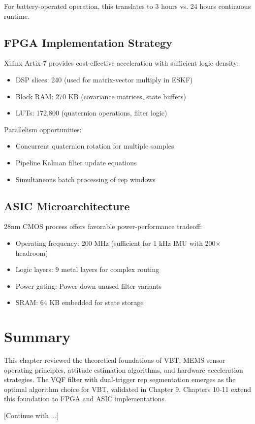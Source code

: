 For battery-operated operation, this translates to 3 hours vs. 24 hours continuous runtime.

\subsection{FPGA Implementation Strategy}

Xilinx Artix-7 provides cost-effective acceleration with sufficient logic density:

\begin{itemize}
    \item DSP slices: 240 (used for matrix-vector multiply in ESKF)
    \item Block RAM: 270 KB (covariance matrices, state buffers)
    \item LUTs: 172,800 (quaternion operations, filter logic)
\end{itemize}

Parallelism opportunities:
\begin{itemize}
    \item Concurrent quaternion rotation for multiple samples
    \item Pipeline Kalman filter update equations
    \item Simultaneous batch processing of rep windows
\end{itemize}

\subsection{ASIC Microarchitecture}

28nm CMOS process offers favorable power-performance tradeoff:

\begin{itemize}
    \item Operating frequency: 200 MHz (sufficient for 1 kHz IMU with 200$\times$ headroom)
    \item Logic layers: 9 metal layers for complex routing
    \item Power gating: Power down unused filter variants
    \item SRAM: 64 KB embedded for state storage
\end{itemize}

\section{Summary}

This chapter reviewed the theoretical foundations of VBT, MEMS sensor operating principles, attitude estimation algorithms, and hardware acceleration strategies. The VQF filter with dual-trigger rep segmentation emerges as the optimal algorithm choice for VBT, validated in Chapter 9. Chapters 10-11 extend this foundation to FPGA and ASIC implementations.

[Continue with ...]